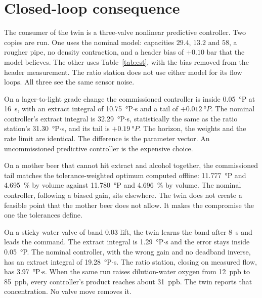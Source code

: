\documentclass[11pt,a4paper]{article}
\begin{document}
\section{Closed-loop consequence}
\label{sec:loop}
The consumer of the twin is a three-valve nonlinear predictive controller. Two copies are run. One uses the nominal model: capacities $29.4$, $13.2$ and $58$, a rougher pipe, no density contraction, and a header bias of $+0.10$ bar that the model believes. The other uses Table~\ref{tab:est}, with the bias removed from the header measurement. The ratio station does not use either model for its flow loops. All three see the same sensor noise.

On a lager-to-light grade change the commissioned controller is inside \SI{0.05}{\degree}P at \SI{16}{\second}, with an extract integral of \SI{10.75}{\degree}P$\cdot$s and a tail of $+\SI{0.012}{\degree}P$. The nominal controller's extract integral is \SI{32.29}{\degree}P$\cdot$s, statistically the same as the ratio station's \SI{31.30}{\degree}P$\cdot$s, and its tail is $+\SI{0.19}{\degree}P$. The horizon, the weights and the rate limit are identical. The difference is the parameter vector. An uncommissioned predictive controller is the expensive choice.

On a mother beer that cannot hit extract and alcohol together, the commissioned tail matches the tolerance-weighted optimum computed offline: \SI{11.777}{\degree}P and \SI{4.695}{\percent} by volume against \SI{11.780}{\degree}P and \SI{4.696}{\percent} by volume. The nominal controller, following a biased gain, sits elsewhere. The twin does not create a feasible point that the mother beer does not allow. It makes the compromise the one the tolerances define.

On a sticky water valve of band $0.03$ lift, the twin learns the band after \SI{8}{\second} and leads the command. The extract integral is \SI{1.29}{\degree}P$\cdot$s and the error stays inside \SI{0.05}{\degree}P. The nominal controller, with the wrong gain and no deadband inverse, has an extract integral of \SI{19.28}{\degree}P$\cdot$s. The ratio station, closing on measured flow, has \SI{3.97}{\degree}P$\cdot$s. When the same run raises dilution-water oxygen from \SI{12}{ppb} to \SI{85}{ppb}, every controller's product reaches about \SI{31}{ppb}. The twin reports that concentration. No valve move removes it.
\end{document}
